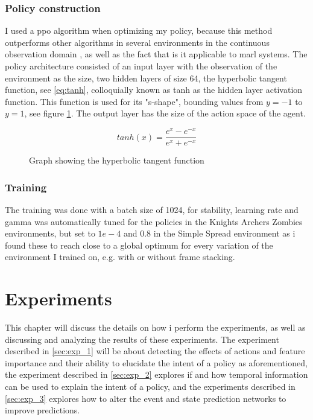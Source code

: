 \documentclass[UKenglish]{uiomasterthesis}
\begin{document}
\subsection{Policy construction}
I used a \ac{ppo} algorithm when optimizing my policy, because this method outperforms other algorithms in several environments in the continuous observation domain \cite{schulman2017proximalpolicyoptimizationalgorithms}, as well as the fact that is it applicable to \ac{marl} systems. The policy architecture consisted of an input layer with the observation of the environment as the size, two hidden layers of size 64, the hyperbolic tangent function, see \ref{eq:tanh}, colloquially known as tanh as the hidden layer activation function. This function is used for its "s-shape", bounding values from $y=-1$ to $y=1$, see figure \ref{fig:tanh}. The output layer has the size of the action space of the agent.

\begin{equation}
\label{eq:tanh}
tanh(x) = \frac{e^x-e^{-x}}{e^x+e^{-x}}
\end{equation}

\begin{figure}[h]
\centering
{}
\caption{Graph showing the hyperbolic tangent function}
\label{fig:tanh}
\end{figure}

\subsection{Training}
The training was done with a batch size of 1024, for stability, learning rate and gamma was automatically tuned for the policies in the Knights Archers Zombies environments, but set to $1e-4$ and $0.8$ in the Simple Spread environment as i found these to reach close to a global optimum for every variation of the environment I trained on, e.g. with or without frame stacking.


\chapter{Experiments}
This chapter will discuss the details on how i perform the experiments, as well as discussing and analyzing the results of these experiments. The experiment described in \ref{sec:exp_1} will be about detecting the effects of actions and feature importance and their ability to elucidate the intent of a policy as aforementioned, the experiment described in \ref{sec:exp_2} explores if and how temporal information can be used to explain the intent of a policy, and the experiments described in \ref{sec:exp_3} explores how to alter the event and state prediction networks to improve predictions.
\end{document}
